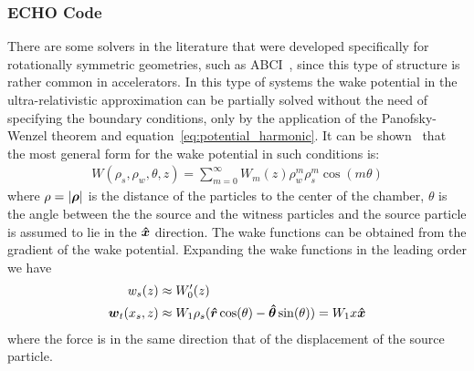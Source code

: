 \subsubsection{ECHO Code}

    There are some solvers in the literature that were developed specifically for rotationally symmetric geometries, such as ABCI~\cite{Chin1994a}, since this type of structure is rather common in accelerators. In this type of systems the wake potential in the ultra-relativistic approximation can be partially solved without the need of specifying the boundary conditions, only by the application of the Panofsky-Wenzel theorem and equation~\eqref{eq:potential_harmonic}. It can be shown~\cite{Stupakov2000a} that the most general form for the wake potential in such conditions is:
    \begin{align}
	       W(\rho_s, \rho_w, \theta, z) = \sum_{m=0}^\infty W_m(z) \rho_w^m\rho_s^m\cos(m\theta)
    \end{align}
    where $\rho = |\boldsymbol{\rho}|$ is the distance of the particles to the center of the chamber, $\theta$ is the angle between the the source and the witness particles and the source particle is assumed to lie in the $\boldsymbol{\hat x}$ direction. The wake functions can be obtained from the gradient of the wake potential. Expanding the wake functions in the leading order we have
    \begin{align}
	    w_s(z) &\approx W'_0(z)\\
	    \boldsymbol{w}_t(x_s, z) &\approx W_1\rho_s(\boldsymbol{\hat r}\cos(\theta)-\boldsymbol{\hat\theta}\sin(\theta)) =
						W_1x\boldsymbol{\hat x}
    \end{align}
    where the force is in the same direction that of the displacement of the source particle.

